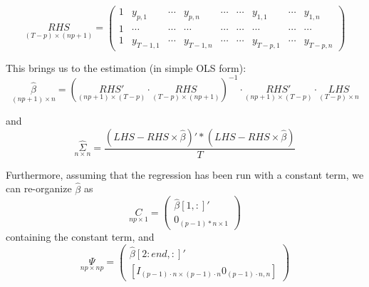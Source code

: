 \documentclass[11pt]{article}
\begin{document}
$$\underset{(T-p)\times (np+1)}{RHS} = \begin{pmatrix}
1 & y_{p,1} &  \cdots & y_{p,n} &  \cdots &  \cdots &  y_{1,1}  & \cdots & y_{1,n}\\
1 & \cdots &  \cdots & \cdots & \cdots &  \cdots &  \cdots & \cdots & \cdots \\
1 & y_{T-1,1} &  \cdots & y_{T-1,n} &  \cdots  &  \cdots  & y_{T-p,1} & \cdots & y_{T-p,n}
\end{pmatrix}$$

This brings us to the estimation (in simple OLS form): 
\begin{equation}\label{1}
\underset{(np +1)\times n}{\hat{\beta}} = (\underset{(np+1)\times (T-p)}{RHS'}\cdot \underset{(T-p)\times (np+1)}{RHS})^{-1}\cdot \underset{(np+1) \times (T-p)}{RHS'}\cdot \underset{(T-p)\times n}{LHS}
\end{equation}

and 
\begin{equation}
\underset{n\times n}{\hat{\Sigma}} = \frac{(LHS-RHS \times \hat{\beta})'*(LHS-RHS \times \hat{\beta})}{T}
\end{equation}

Furthermore, assuming that the regression has been run with a constant term, we can re-organize $\hat{\beta}$ as 
\begin{equation}
\underset{np\times 1}{C} = \begin{pmatrix} \hat{\beta}[1,:]'\\ 0_{(p-1)*n\times 1} \end{pmatrix}
\end{equation}
 containing the constant term, and 
\begin{equation}\underset{np\times np}{\Psi} = \begin{pmatrix} \hat{\beta}[2:end,:]'\\
[I_{(p-1)\cdot n \times (p-1)\cdot n} 0_{(p-1)\cdot n,n}] \end{pmatrix}
\end{equation}
\end{document}
